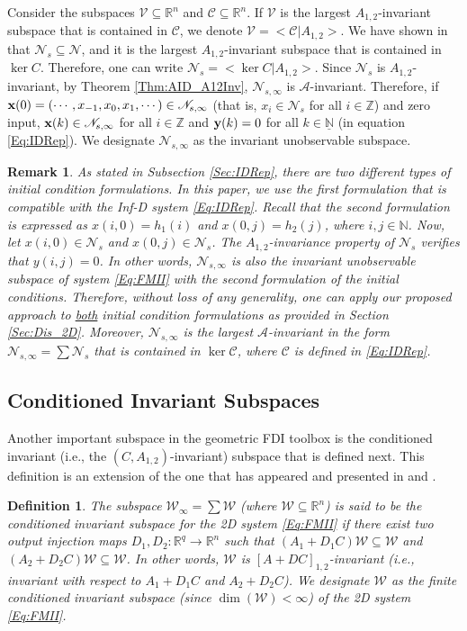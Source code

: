 \documentclass[journal,12pt,draftcls,onecolumn]{IEEEtran}
\newcommand{\ssp}[1]{\mathscr{#1}}      \newcommand{\setssp}[1]{\mathfrak{#1}}   \newcommand{\fld}[1]{\mathbb{#1}}       \newcommand{\op}[1]{\mathcal{#1}}       \newcommand{\sumbanach}[1]{\sum{#1}}
\def\QEDclosed{\hfill\IEEEQEDclosed}
\renewcommand{\qed}{\QEDclosed}
\newtheorem{remark}{Remark}
\newtheorem{definition}{Definition}
\begin{document}
Consider the subspaces $\ssp{V}\subseteq\fld{R}^n$ and $\ssp{C}\subseteq\fld{R}^n$. If $\ssp{V}$ is the largest $A_{1,2}$-invariant subspace that is contained in $\ssp{C}$, we denote $\ssp{V} = <\ssp{C}|A_{1,2}>$. We have shown in \cite{ACC2013} that $\ssp{N}_s\subseteq\ssp{N}$, and it is the largest $A_{1,2}$-invariant subspace that is contained in $\ker C$. Therefore,  one can write $\ssp{N}_s = <\ker C|A_{1,2}>$. Since $\ssp{N}_s$ is $A_{1,2}$-invariant, by Theorem \ref{Thm:AID_A12Inv}, $\ssp{N}_{s,\infty}$ is $\op{A}$-invariant. Therefore, if ${\bf x}(0) = (\cdots,x_{-1},x_0,x_1,\cdots)\in\ssp{N}_{s,\infty}$ (that is, $x_i\in\ssp{N}_s$ for all $i\in\fld{Z}$) and zero input, ${\bf x}(k)\in\ssp{N}_{s,\infty}$ for all $i\in\fld{Z}$ and ${\bf y}(k)=0$ for all $k\in\underline{\fld{N}}$ (in equation \eqref{Eq:IDRep}). We designate  $\ssp{N}_{s,\infty}$ as the invariant unobservable subspace.
\begin{remark}\label{Rem:InitCond}
	As stated in Subsection \ref{Sec:IDRep}, there are two different types of initial condition formulations. In this paper, we use the first formulation that is compatible with the Inf-D system \eqref{Eq:IDRep}. Recall that the second formulation is expressed as $x(i,0)=h_1(i)$ and $x(0,j)=h_2(j)$, where $i,j\in\fld{N}$.  Now, let $x(i,0)\in\ssp{N}_s$ and $x(0,j)\in\ssp{N}_s$. The $A_{1,2}$-invariance property of $\ssp{N}_s$ verifies that $y(i,j)=0$. In other words, $\ssp{N}_{s,\infty}$ is also the invariant unobservable subspace of system \eqref{Eq:FMII} with the second formulation of the initial conditions. Therefore, without loss of any generality, one can apply our proposed approach to \underline{both} initial condition formulations as provided in Section \ref{Sec:Dis_2D}. Moreover, $\ssp{N}_{s,\infty}$ is the largest $\op{A}$-invariant in the form $\ssp{N}_{s,\infty}=\sumbanach{\ssp{N}_s}$ that is contained in $\ker\op{C}$, where $\op{C}$ is defined in \eqref{Eq:IDRep}.
\end{remark}


\subsection{Conditioned Invariant Subspaces}

Another important subspace in the geometric FDI toolbox is the conditioned invariant (i.e., the $(C,A_{1,2})$-invariant) subspace that is defined next. This definition is an extension of the one that has appeared and presented in \cite{conte1988GeometryConf} and \cite{conte1988GeometryArticle}.
\begin{definition}\label{Def:CondInv}
	The subspace $\ssp{W}_\infty=\sum \ssp{W}$ (where $\ssp{W}\subseteq\fld{R}^{n}$) is said to be the conditioned invariant subspace for the 2D system \eqref{Eq:FMII} if there exist two output injection maps $D_1,D_2: \fld{R}^{q}\rightarrow \fld{R}^{n}$ such that $ (A_1+D_1C)\ssp{W}\subseteq\ssp{W}$ and
	$(A_2+D_2C)\ssp{W}\subseteq\ssp{W}$. In other words, $\ssp{W}$ is  $[A+DC]_{1,2}$-invariant (i.e., invariant with respect to $A_1+D_1C$ and $A_2+D_2C$). We designate $\ssp{W}$ as the finite conditioned invariant subspace (since $\dim(\ssp{W})<\infty$) of the 2D system \eqref{Eq:FMII}.\qed
\end{definition}
\end{document}
